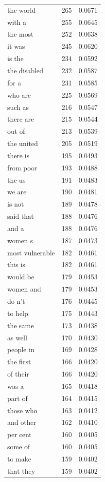 \begin{tabular}{lrl}
the world & 265 & 0.0671 \\
with a & 255 & 0.0645 \\
the most & 252 & 0.0638 \\
it was & 245 & 0.0620 \\
is the & 234 & 0.0592 \\
the disabled & 232 & 0.0587 \\
for a & 231 & 0.0585 \\
who are & 225 & 0.0569 \\
such as & 216 & 0.0547 \\
there are & 215 & 0.0544 \\
out of & 213 & 0.0539 \\
the united & 205 & 0.0519 \\
there is & 195 & 0.0493 \\
from poor & 193 & 0.0488 \\
the us & 191 & 0.0483 \\
we are & 190 & 0.0481 \\
is not & 189 & 0.0478 \\
said that & 188 & 0.0476 \\
and a & 188 & 0.0476 \\
women s & 187 & 0.0473 \\
most vulnerable & 182 & 0.0461 \\
this is & 182 & 0.0461 \\
would be & 179 & 0.0453 \\
women and & 179 & 0.0453 \\
do n't & 176 & 0.0445 \\
to help & 175 & 0.0443 \\
the same & 173 & 0.0438 \\
as well & 170 & 0.0430 \\
people in & 169 & 0.0428 \\
the first & 166 & 0.0420 \\
of their & 166 & 0.0420 \\
was a & 165 & 0.0418 \\
part of & 164 & 0.0415 \\
those who & 163 & 0.0412 \\
and other & 162 & 0.0410 \\
per cent & 160 & 0.0405 \\
some of & 160 & 0.0405 \\
to make & 159 & 0.0402 \\
that they & 159 & 0.0402 \\

\end{tabular}
